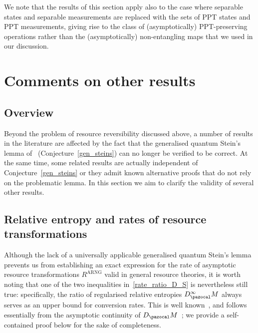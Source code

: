 \documentclass[11pt,notitlepage,tightenlines,nofootinbib,superscriptaddress]{revtex4-1}
\begin{document}
We note that the results of this section apply also to the case where separable states and separable measurements are replaced with the sets of PPT states and PPT measurements, giving rise to the class of (asymptotically) PPT-preserving operations rather than the (asymptotically) non-entangling maps that we used in our discussion.


\section{Comments on other results}\label{sec:comments}

\subsection{Overview}

Beyond the problem of resource reversibility discussed above, a number of results in the literature are affected by the fact that the generalised quantum Stein's lemma of~\cite{Brandao2010} (Conjecture~\ref{gen_steins}) can no longer be verified to be correct. At the same time, some related results are actually independent of Conjecture~\ref{gen_steins} or they admit known alternative proofs that do not rely on the problematic lemma. In this section we aim to clarify the validity of several other results.


\subsection{Relative entropy and rates of resource transformations}

Although the lack of a universally applicable generalised quantum Stein's lemma prevents us from establishing an exact expression for the rate of asymptotic resource transformations $R^{\mathrm{ARNG}}$ valid in general resource theories, it is worth noting that one of the two inequalities in~\eqref{rate_ratio_D_S} is nevertheless still true: specifically, the ratio of regularised relative entropies $D^\infty_\MM$ always serves as an upper bound for conversion rates. This is well known~\cite{Horodecki2001,horodecki_2012}, and follows essentially from the asymptotic continuity of $D_\MM$~\cite{Synak2006,tightuniform}; we provide a self-contained proof below for the sake of completeness.
\end{document}
